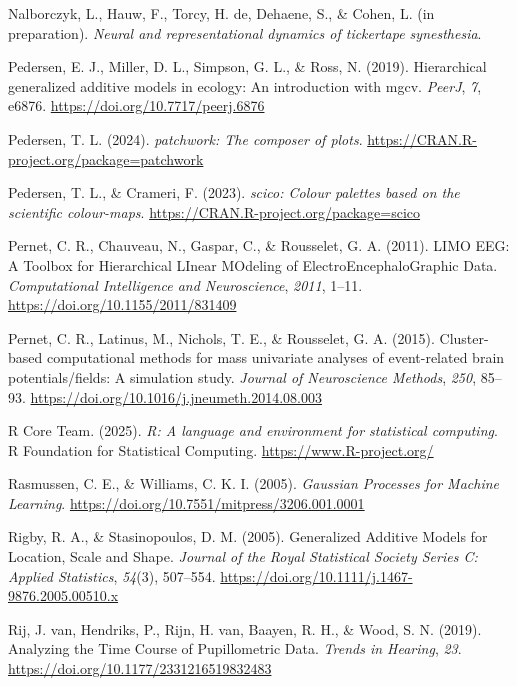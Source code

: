 \documentclass[
  doc,
  floatsintext,
  longtable,
  a4paper,
  nolmodern,
  notxfonts,
  notimes,
  donotrepeattitle,
  colorlinks=true,linkcolor=blue,citecolor=blue,urlcolor=blue]{apa7}
\newlength{\cslhangindent}
\newenvironment{CSLReferences}[2] %
 {\begin{list}{}{%
  \setlength{\itemindent}{0pt}
  \setlength{\leftmargin}{0pt}
  \setlength{\parsep}{0pt}
  \ifodd #1
   \setlength{\leftmargin}{\cslhangindent}
   \setlength{\itemindent}{-1\cslhangindent}
  \fi
  \setlength{\itemsep}{#2\baselineskip}}}
 {\end{list}}
\begin{document}
\begin{CSLReferences}{1}{0}
Nalborczyk, L., Hauw, F., Torcy, H. de, Dehaene, S., \& Cohen, L. (in
preparation). \emph{Neural and representational dynamics of tickertape
synesthesia}.

Pedersen, E. J., Miller, D. L., Simpson, G. L., \& Ross, N. (2019).
Hierarchical generalized additive models in ecology: An introduction
with mgcv. \emph{PeerJ}, \emph{7}, e6876.
\url{https://doi.org/10.7717/peerj.6876}

Pedersen, T. L. (2024). \emph{{patchwork}: The composer of plots}.
\url{https://CRAN.R-project.org/package=patchwork}

Pedersen, T. L., \& Crameri, F. (2023). \emph{{scico}: Colour palettes
based on the scientific colour-maps}.
\url{https://CRAN.R-project.org/package=scico}

Pernet, C. R., Chauveau, N., Gaspar, C., \& Rousselet, G. A. (2011).
LIMO EEG: A Toolbox for Hierarchical LInear MOdeling of
ElectroEncephaloGraphic Data. \emph{Computational Intelligence and
Neuroscience}, \emph{2011}, 1--11.
\url{https://doi.org/10.1155/2011/831409}

Pernet, C. R., Latinus, M., Nichols, T. E., \& Rousselet, G. A. (2015).
Cluster-based computational methods for mass univariate analyses of
event-related brain potentials/fields: A simulation study. \emph{Journal
of Neuroscience Methods}, \emph{250}, 85--93.
\url{https://doi.org/10.1016/j.jneumeth.2014.08.003}

R Core Team. (2025). \emph{{R}: A language and environment for
statistical computing}. R Foundation for Statistical Computing.
\url{https://www.R-project.org/}

Rasmussen, C. E., \& Williams, C. K. I. (2005). \emph{Gaussian Processes
for Machine Learning}.
\url{https://doi.org/10.7551/mitpress/3206.001.0001}

Rigby, R. A., \& Stasinopoulos, D. M. (2005). Generalized Additive
Models for Location, Scale and Shape. \emph{Journal of the Royal
Statistical Society Series C: Applied Statistics}, \emph{54}(3),
507--554. \url{https://doi.org/10.1111/j.1467-9876.2005.00510.x}

Rij, J. van, Hendriks, P., Rijn, H. van, Baayen, R. H., \& Wood, S. N.
(2019). Analyzing the Time Course of Pupillometric Data. \emph{Trends in
Hearing}, \emph{23}. \url{https://doi.org/10.1177/2331216519832483}


\end{CSLReferences}
\end{document}
